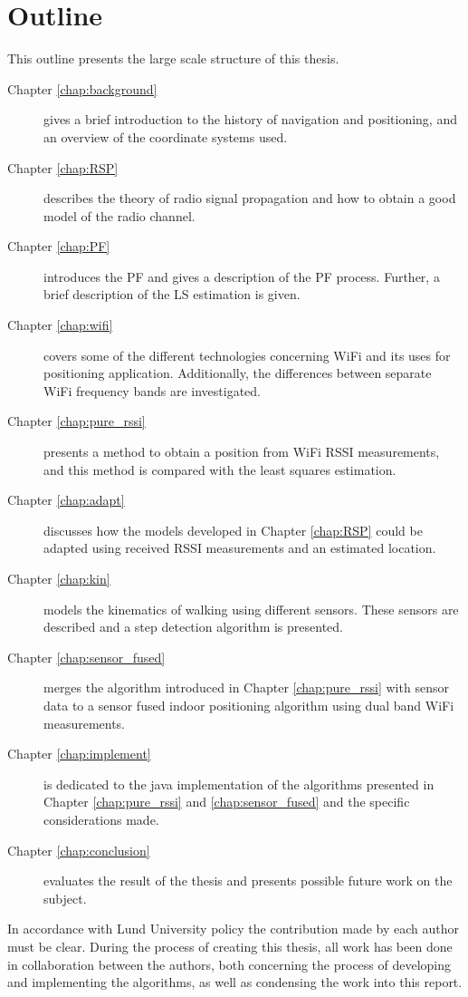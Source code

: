 \documentclass{LTHthesis}
\begin{document}
\section{Outline}
%
This outline presents the large scale structure of this thesis.
%
\begin{description}
\item[Chapter \ref{chap:background}] gives a brief introduction to the history of navigation and positioning, and an overview of the coordinate systems used.  
%
\item[Chapter \ref{chap:RSP}] describes the theory of radio signal propagation and how to obtain a good model of the radio channel. 
%
\item[Chapter \ref{chap:PF}] introduces the PF and gives a description of the PF process. Further, a brief description of the LS estimation is given. 
%
\item[Chapter \ref{chap:wifi}] covers some of the different technologies concerning WiFi and its uses for positioning application. Additionally, the differences between separate WiFi frequency bands are investigated. 
%
\item[Chapter \ref{chap:pure_rssi}] presents a method to obtain a position from WiFi RSSI measurements, and this method is compared with the least squares estimation.  
%
\item[Chapter \ref{chap:adapt}] discusses how the models developed in Chapter \ref{chap:RSP} could be adapted using received RSSI measurements and an estimated location.
%
\item[Chapter \ref{chap:kin}] models the kinematics of walking using different sensors. These sensors are described and a step detection algorithm is presented. 
%
\item[Chapter \ref{chap:sensor_fused}] merges the algorithm introduced in Chapter \ref{chap:pure_rssi} with sensor data to a sensor fused indoor positioning algorithm using dual band WiFi measurements.
%
\item[Chapter \ref{chap:implement}] is dedicated to the java implementation of the algorithms presented in Chapter \ref{chap:pure_rssi} and \ref{chap:sensor_fused} and the specific considerations made. 
%
\item[Chapter \ref{chap:conclusion}] evaluates the result of the thesis and presents possible future work on the subject. 
%
\end{description}
%
In accordance with Lund University policy the contribution made by each author must be clear. During the process of creating this thesis, all work has been done in collaboration between the authors, both concerning the process of developing and implementing the algorithms, as well as condensing the work into this report. 
%
\end{document}
